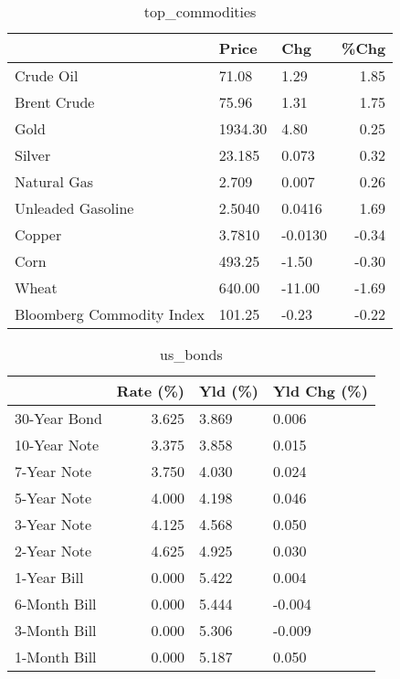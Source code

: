 \documentclass{article}%
\begin{document}
\begin{table}[htbp]%
\caption{top\_commodities}%
\centering%
\begin{adjustbox}{width=1\textwidth}%
\begin{tabular}{lllr}
\toprule
                          &   Price &     Chg &  \%Chg \\
\midrule
               Crude Oil  &   71.08 &    1.29 &  1.85 \\
             Brent Crude  &   75.96 &    1.31 &  1.75 \\
                    Gold  & 1934.30 &    4.80 &  0.25 \\
                  Silver  &  23.185 &   0.073 &  0.32 \\
             Natural Gas  &   2.709 &   0.007 &  0.26 \\
       Unleaded Gasoline  &  2.5040 &  0.0416 &  1.69 \\
                  Copper  &  3.7810 & -0.0130 & -0.34 \\
                    Corn  &  493.25 &   -1.50 & -0.30 \\
                   Wheat  &  640.00 &  -11.00 & -1.69 \\
Bloomberg Commodity Index &  101.25 &   -0.23 & -0.22 \\
\bottomrule
\end{tabular}
%
\end{adjustbox}%
\end{table}

%


\begin{table}[htbp]%
\caption{us\_bonds}%
\centering%
\begin{adjustbox}{width=1\textwidth}%
\begin{tabular}{lrll}
\toprule
             &  Rate (\%) & Yld (\%) & Yld Chg (\%) \\
\midrule
30-Year Bond &     3.625 &   3.869 &       0.006 \\
10-Year Note &     3.375 &   3.858 &       0.015 \\
 7-Year Note &     3.750 &   4.030 &       0.024 \\
 5-Year Note &     4.000 &   4.198 &       0.046 \\
 3-Year Note &     4.125 &   4.568 &       0.050 \\
 2-Year Note &     4.625 &   4.925 &       0.030 \\
 1-Year Bill &     0.000 &   5.422 &       0.004 \\
6-Month Bill &     0.000 &   5.444 &      -0.004 \\
3-Month Bill &     0.000 &   5.306 &      -0.009 \\
1-Month Bill &     0.000 &   5.187 &       0.050 \\
\bottomrule
\end{tabular}
%
\end{adjustbox}%
\end{table}
\end{document}
